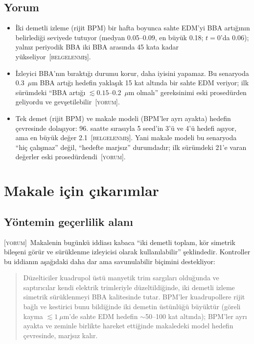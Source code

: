 \documentclass[11pt,a4paper]{article}
\newcommand{\BEL}{\textsc{[belgelenmiş]}}
\newcommand{\YOR}{\textsc{[yorum]}}
\begin{document}
\subsection{Yorum}
\begin{itemize}
\item İki demetli izleme (rijit BPM) bir hafta boyunca sahte EDM'yi BBA artığının belirlediği seviyede
tutuyor (medyan 0.05--0.09, en büyük 0.18; $t=0$'da 0.06); yalnız periyodik BBA iki BBA arasında 45 kata
kadar yükseliyor~\BEL.
\item İzleyici BBA'nın bıraktığı durumu korur, daha iyisini yapamaz. Bu senaryoda 0.3~$\mu$m BBA artığı
hedefin yaklaşık 15 kat altında bir sahte EDM veriyor; ilk sürümdeki ``BBA artığı
$\lesssim0.15$--0.2~$\mu$m olmalı'' gereksinimi eski prosedürden geliyordu ve gevşetilebilir~\YOR.
\item Tek demet (rijit BPM) ve makale modeli (BPM'ler ayrı ayakta) hedefin çevresinde dolaşıyor: 96. saatte
sırasıyla 5 seed'in 3'ü ve 4'ü hedefi aşıyor, ama en büyük değer 2.1~\BEL. Yani makale modeli bu
senaryoda ``hiç çalışmaz'' değil, ``hedefte marjsız'' durumdadır; ilk sürümdeki 21'e varan değerler eski
prosedürdendi~\YOR.
\end{itemize}

\section{Makale için çıkarımlar}

\subsection{Yöntemin geçerlilik alanı}
\YOR~Makalenin bugünkü iddiası kabaca ``iki demetli toplam, kör simetrik bileşeni görür ve sürüklenme
izleyicisi olarak kullanılabilir'' şeklindedir. Kontroller bu iddianın aşağıdaki daha dar ama savunulabilir
biçimini destekliyor:

\begin{quote}
Düzelticiler kuadrupol üstü manyetik trim sargıları olduğunda ve saptırıcılar kendi elektrik trimleriyle
düzeltildiğinde, iki demetli izleme simetrik sürüklenmeyi BBA kalitesinde tutar. BPM'ler kuadrupollere
rijit bağlı ve kestirici bunu bildiğinde iki demetin üstünlüğü büyüktür (göreli kayma
$\lesssim1~\mu$m'de sahte EDM hedefin $\sim$50--100 kat altında); BPM'ler ayrı ayakta ve zeminle birlikte
hareket ettiğinde makaledeki model hedefin çevresinde, marjsız kalır.
\end{quote}
\end{document}
